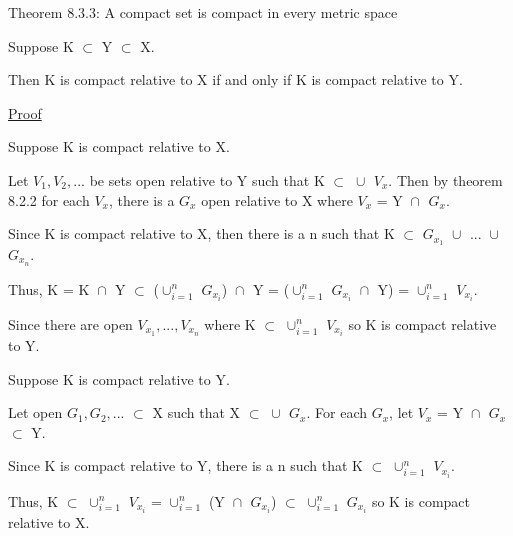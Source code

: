 { \color{red} Theorem 8.3.3: A compact set is compact in every metric space } 

	\begin{adjustbox}{minipage=14cm, right, vspace=0.1cm 0cm}
		Suppose K $\subset$ Y $\subset$ X.

		Then K is compact relative to X if and only if K is
		compact relative to Y.
	\end{adjustbox}

{ \color{magenta} \underline{Proof} } 

	Suppose K is compact relative to X.

	Let $V_1, V_2, ...$ be sets open relative to Y such that
	K $\subset$ $\cup_{}^{}$ $V_x$.
	Then by {\color{red} theorem 8.2.2} for each $V_x$, there is a
	$G_x$ open relative to X where $V_x$ = Y $\cap_{}^{}$ $G_x$.

	Since K is compact relative to X, then there is a n such that
	K $\subset$ $G_{x_1}$ $\cup_{}^{}$ ... $\cup_{}^{}$ $G_{x_n}$.

	Thus, K = K $\cap_{}^{}$ Y $\subset$ ($\cup_{i=1}^{n}$ $G_{x_i}$) $\cap_{}^{}$ Y
	= ($\cup_{i=1}^{n}$ $G_{x_i}$ $\cap_{}^{}$ Y) = $\cup_{i=1}^{n}$ $V_{x_i}$.
	
	Since there are open $V_{x_1}, ... , V_{x_n}$ where
	K $\subset$ $\cup_{i=1}^{n}$ $V_{x_i}$ so K is compact relative to Y.

	Suppose K is compact relative to Y.

	Let open $G_1, G_2, ...$ $\subset$ X such that X $\subset$ $\cup_{}^{}$ $G_x$.
	For each $G_x$, let $V_x$ = Y $\cap_{}^{}$ $G_x$ $\subset$ Y.

	Since K is compact relative to Y, there is a n such that
	K $\subset$ $\cup_{i=1}^{n}$ $V_{x_i}$.

	Thus, K $\subset$ $\cup_{i=1}^{n}$ $V_{x_i}$
	= $\cup_{i=1}^{n}$ (Y $\cap_{}^{}$ $G_{x_i}$)
	$\subset$ $\cup_{i=1}^{n}$ $G_{x_i}$ so K is compact relative to X.

